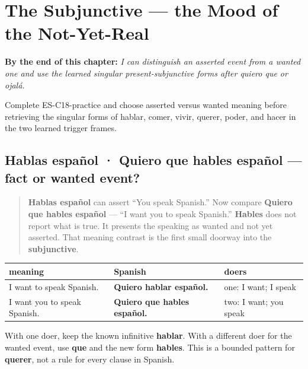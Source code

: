 
\chapter{The Subjunctive --- the Mood of the Not-Yet-Real}
\label{ch:subjunctive}

\begin{chapteropening}
\textbf{By the end of this chapter:} \emph{I can distinguish an asserted event from a wanted one and use the learned singular present-subjunctive forms after quiero que or ojalá.}

Complete ES-C18-practice and choose asserted versus wanted meaning before retrieving the singular forms of hablar, comer, vivir, querer, poder, and hacer in the two learned trigger frames.
\end{chapteropening}

\section[Hablas español · Quiero que hables español]{Hablas español · Quiero que hables español — fact or wanted event?}

\label{lesson:ES-C18-quiero-que}



\begin{quote}
\textbf{Hablas español} can assert “You speak Spanish.” Now compare \textbf{Quiero que hables español} — “I want you to speak Spanish.” \textbf{Hables} does not report what is true. It presents the speaking as wanted and not yet asserted. That meaning contrast is the first small doorway into the \textbf{subjunctive}.
\end{quote}

\begin{grammarlens}[title={Grammar Lens: count the doers}]
\noindent
\begin{tabularx}{\linewidth}{@{}>{\raggedright\arraybackslash}X>{\raggedright\arraybackslash}X>{\raggedright\arraybackslash}X@{}}
\toprule
\textbf{meaning} & \textbf{Spanish} & \textbf{doers} \\
\midrule
I want to speak Spanish. & \textbf{Quiero hablar español.} & one: I want; I speak \\
I want you to speak Spanish. & \textbf{Quiero que hables español.} & two: I want; you speak \\
\bottomrule
\end{tabularx}

With one doer, keep the known infinitive \textbf{hablar}. With a different doer for the wanted event, use \textbf{que} and the new form \textbf{hables}. This is a bounded pattern for \textbf{querer}, not a rule for every clause in Spanish.
\end{grammarlens}

